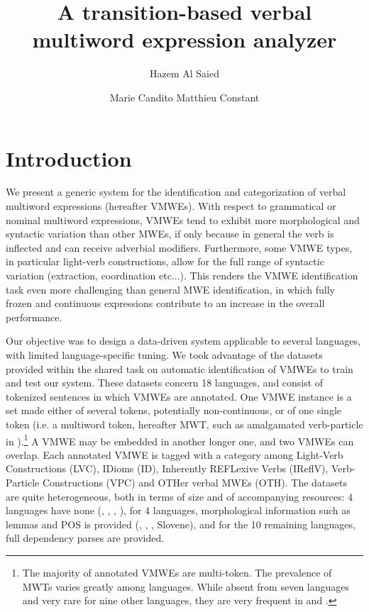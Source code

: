 \documentclass[output=paper,modfonts]{langscibook}
\title{A transition-based verbal multiword expression analyzer}
\author{Hazem Al Saied\affiliation{ATILF UMR 7118, Universit\'e de Lorraine/CNRS}\and 
 Marie Candito\affiliation{LLF UMR 7110, Universit\'e Paris Diderot/CNRS}\lastand 
 Matthieu Constant\affiliation{ATILF UMR 7118, Universit\'e de Lorraine/CNRS}}
\begin{document}
\maketitle
\label{ALSAIED-CHAPTER}
\section{Introduction}
We present a generic system for the identification and categorization of verbal multiword expressions (hereafter VMWEs).
With respect to grammatical or nominal multiword expressions, VMWEs tend to exhibit more morphological and syntactic variation than other MWEs, if only because in general the verb is inflected and can receive adverbial modifiers. Furthermore, some VMWE types, in particular light-verb constructions, allow for the full range of syntactic variation (extraction, coordination etc...). This renders the VMWE identification task even more challenging than general MWE identification, in which fully frozen and continuous expressions contribute to an increase in the overall performance.

Our objective was to design a data-driven system applicable to several languages, with limited language-specific tuning. We took advantage of the datasets provided within the shared task on automatic identification of VMWEs \citep{MWEWorkshop} to train and test our system.
These datasets concern 18 languages, and consist of tokenized sentences in which VMWEs are annotated. One VMWE instance is a set made either of several tokens, potentially non-continuous, or of one single token  (i.e. a multiword token, hereafter MWT, such as amalgamated verb-particle in ).\footnote{The majority of annotated VMWEs are multi-token. The prevalence of MWTs varies greatly among languages. While absent from seven languages and very rare for nine other languages, they are very frequent in  and .} A VMWE may be embedded in another longer one, and two VMWEs can overlap. Each annotated VMWE is tagged with a category among Light-Verb Constructions (LVC), IDioms (ID), Inherently REFLexive Verbs (IReflV), Verb-Particle Constructions (VPC) and OTHer verbal MWEs (OTH). The datasets are quite heterogeneous, both in terms of size and of accompanying resources: 4 languages have none (, , , ), for 4 languages, morphological information such as lemmas and POS is provided (, , , Slovene), and for the 10 remaining languages, full dependency parses are provided.
\end{document}
